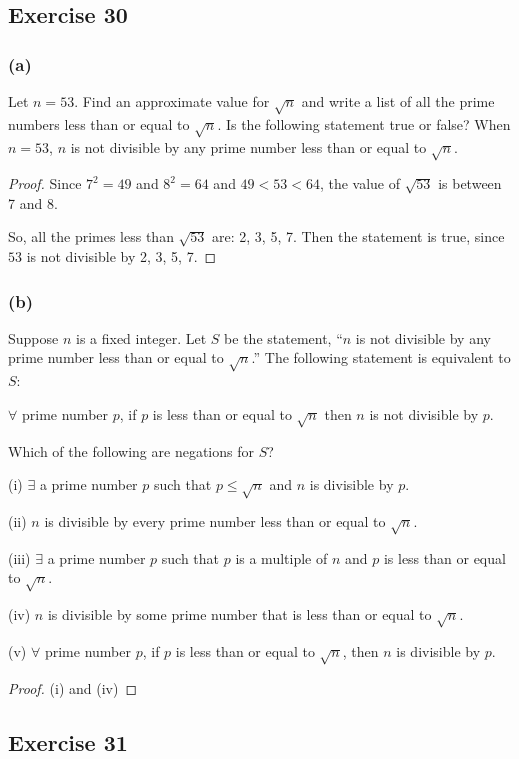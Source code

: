 \documentclass[14pt]{extarticle}
\newcommand{\fa}{\forall}
\newcommand{\te}{\exists}
\begin{document}
\subsection{Exercise 30}
\subsubsection{(a)}
Let $n = 53$. Find an approximate value for $\sqrt{n}$ and write a list of all the prime numbers less than or equal to $\sqrt{n}$. Is the following statement true or false? When $n = 53$, $n$ is not divisible by any prime number less than or equal to $\sqrt{n}$.

\begin{proof}
Since $7^2 = 49$ and $8^2 = 64$ and $49 < 53 < 64$, the value of $\sqrt{53}$ is between 7 and 8.

So, all the primes less than $\sqrt{53}$ are: 2, 3, 5, 7. Then the statement is true, since $53$ is not divisible by 2, 3, 5, 7.
\end{proof}

\subsubsection{(b)}
Suppose $n$ is a fixed integer. Let $S$ be the statement, “$n$ is not divisible by any prime number less than or equal to $\sqrt{n}$.” The following statement is equivalent to $S$: 

$\fa$ prime number $p$, if $p$ is less than or equal to $\sqrt{n}$ then $n$ is not divisible by $p$. 

Which of the following are negations for $S$?

(i) $\te$ a prime number $p$ such that $p \leq \sqrt{n}$ and $n$ is divisible by $p$.

(ii) $n$ is divisible by every prime number less than or equal to $\sqrt{n}$.

(iii) $\te$ a prime number $p$ such that $p$ is a multiple of $n$ and $p$ is less than or equal to $\sqrt{n}$.

(iv) $n$ is divisible by some prime number that is less than or equal to $\sqrt{n}$.

(v) $\fa$ prime number $p$, if $p$ is less than or equal to $\sqrt{n}$, then $n$ is divisible by $p$.

\begin{proof}
(i) and (iv)
\end{proof}

\subsection{Exercise 31}
\end{document}
